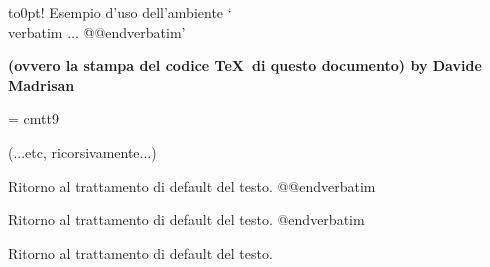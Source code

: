 \noindent \raise-1.4pt\hbox to0pt{\hss\bigbf!\hskip2.4mm}%
    {\twelvebf Esempio d'uso dell'ambiente}
   `{\twelvett\\verbatim $\dots$ @@endverbatim}' \par
\smallskip
\noindent \bf (ovvero la stampa del codice \TeX\ di questo documento)
\medskip
\noindent by Davide Madrisan 
\vskip12mm

\verbatim

\font\ninett = cmtt9 % carattere typewriter (famiglia \tt) a 9pt

    (...etc, ricorsivamente...)

\noindent Ritorno al trattamento di default del testo.
\bye 
@@endverbatim

\noindent Ritorno al trattamento di default del testo.
\bye 
@endverbatim

\noindent Ritorno al trattamento di default del testo.
\bye

